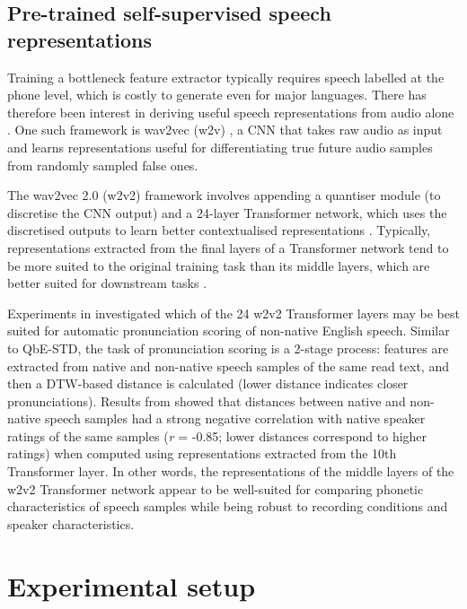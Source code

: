 \documentclass{article}
\begin{document}
\subsection{Pre-trained self-supervised speech representations}

Training a bottleneck feature extractor typically requires speech labelled at the phone level, which is costly to generate even for major languages.
There has therefore been interest in deriving useful speech representations from audio alone \cite{chen2018almost,kahn2020self}.
One such framework is wav2vec (w2v) \cite{schneiderWav2vecUnsupervisedPretraining2019}, a CNN that takes raw audio as input and learns representations useful for differentiating true future audio samples from randomly sampled false ones. 

The wav2vec 2.0 (w2v2) framework involves appending a quantiser module (to discretise the CNN output) and a 24-layer Transformer network, which uses the discretised outputs to learn better contextualised representations \cite{baevskiWav2vecFrameworkSelfsupervisedtoappear}.
Typically, representations extracted from the final layers of a Transformer network tend to be more suited to the original training task than its middle layers, which are better suited for downstream tasks \cite{tenney-etal-2019-bert}.

Experiments in \cite{bartelds2020neural} investigated which of the 24 w2v2 Transformer layers may be best suited for automatic pronunciation scoring of non-native English speech.
Similar to QbE-STD, the task of pronunciation scoring is a 2-stage process: features are extracted from native and non-native speech samples of the same read text, and then a DTW-based distance is calculated (lower distance indicates closer pronunciations).
Results from \cite{bartelds2020neural} showed that distances between native and non-native speech samples had a strong negative correlation with native speaker ratings of the same samples (\emph{r} = -0.85; lower distances correspond to higher ratings) when computed using representations extracted from the 10th Transformer layer.
In other words, the representations of the middle layers of the w2v2 Transformer network appear to be well-suited for comparing phonetic characteristics of speech samples while being robust to recording conditions and speaker characteristics.

\section{Experimental setup}
\end{document}
